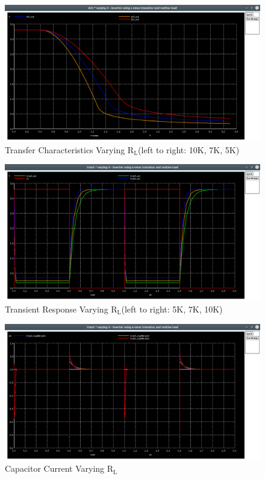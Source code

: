 \documentclass[12pt]{article}
\begin{document}
    \begin{figure}[H]
		\begin{center}
			\includegraphics[scale=0.25]{images/inverter_Rl_dc.png}
			\caption{Transfer Characteristics Varying $\text{R}_\text{L}$(left to right: 10K, 7K, 5K)}
			\label{fig::varying_rl_dc}
		\end{center}
	\end{figure}
	\begin{figure}[H]
		\begin{center}
			\includegraphics[scale=0.25]{images/inverter_Rl_tran.png}
			\caption{Transient Response Varying $\text{R}_\text{L}$(left to right: 5K, 7K, 10K)}
			\label{fig::varying_rl_time}
		\end{center}
	\end{figure}
	
	\begin{figure}[H]
		\begin{center}
			\includegraphics[scale=0.25]{images/inverter_Rl_vcap.png}
			\caption{Capacitor Current Varying $\text{R}_\text{L}$}
			\label{fig::varying_rl_vcap}
		\end{center}
	\end{figure}
	
\end{document}
